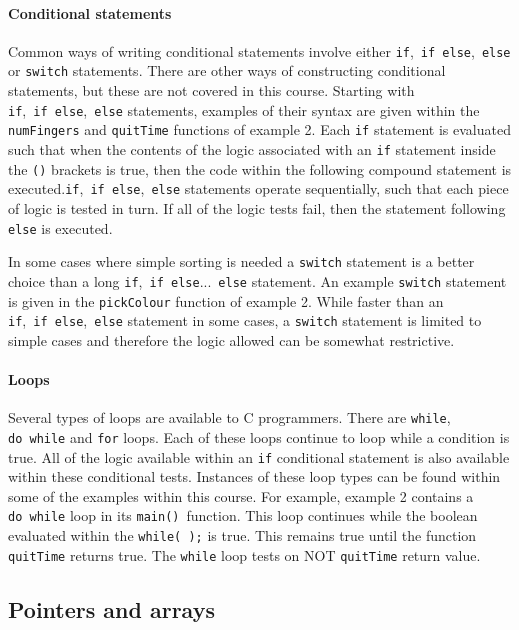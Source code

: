 \documentclass[11pt]{scrartcl}
\def\main{\texttt{main()}}
\begin{document}
\paragraph{Conditional statements}
Common ways of writing conditional statements involve either \texttt{if},~\texttt{if~else},~\texttt{else} or \texttt{switch} statements.  There are other ways of constructing conditional statements, but these are not covered in this course.  Starting with \texttt{if},~\texttt{if~else},~\texttt{else} statements, examples of their syntax are given within the \texttt{numFingers} and \texttt{quitTime} functions of example 2.  Each \texttt{if} statement is evaluated such that when the contents of the logic associated with an \texttt{if} statement inside the \texttt{()} brackets is true, then the code within the following compound statement is executed.\texttt{if},~\texttt{if~else},~\texttt{else} statements operate
sequentially, such that each piece of logic is tested in turn.  If all of the logic tests fail, then the statement following \texttt{else} is executed.

In some cases where simple sorting is needed a \texttt{switch}
statement is a better choice than a long
\texttt{if},~\texttt{if~else}...~\texttt{else} statement.  An example
\texttt{switch} statement is given in the \texttt{pickColour} function
of example 2.  While faster than an
\texttt{if},~\texttt{if~else},~\texttt{else} statement in some cases, a
\texttt{switch} statement is limited to simple cases and therefore the
logic allowed can be somewhat restrictive.

\paragraph{Loops}
Several types of loops are available to C programmers.  There are
\texttt{while}, \texttt{do~while} and \texttt{for} loops.  Each of
these loops continue to loop while a condition is true.  All of the logic
available within an \texttt{if} conditional statement is also
available within these conditional tests.  Instances of these loop
types can be found within some of the examples within this course.
For example, example 2 contains a \texttt{do~while} loop in its
\main\ function.  This loop continues while
the boolean evaluated within the \texttt{while(~);} is true.  This
remains true until the function \texttt{quitTime} returns true.  The
\texttt{while} loop tests on NOT \texttt{quitTime} return value.

\subsection{Pointers and arrays \label{section:pointersarrays}}
\end{document}
